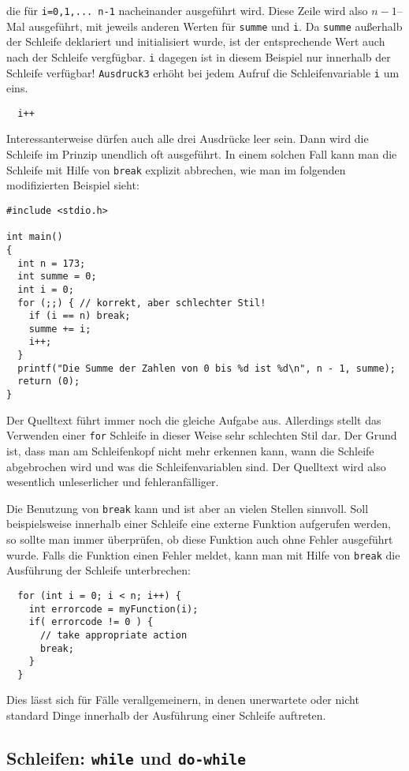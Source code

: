 die für \verb|i=0,1,... n-1| nacheinander ausgeführt wird.
Diese Zeile wird also $n-1$--Mal ausgeführt, mit jeweils anderen Werten für \verb|summe| und \verb|i|.
Da \verb|summe| außerhalb der Schleife deklariert und initialisiert wurde, ist der entsprechende Wert auch nach der Schleife vergfügbar.
\verb|i| dagegen ist in diesem Beispiel nur innerhalb der Schleife verfügbar!
\texttt{Ausdruck3} erhöht bei jedem Aufruf die Schleifenvariable \verb|i| um eins.
\begin{lstlisting}
  i++
\end{lstlisting}
Interessanterweise dürfen auch alle drei Ausdrücke leer sein.
Dann wird die Schleife im Prinzip unendlich oft ausgeführt.
In einem solchen Fall kann man die Schleife mit Hilfe von \verb|break| explizit abbrechen, wie man im folgenden modifizierten Beispiel sieht:
\begin{lstlisting}
#include <stdio.h>

int main()
{
  int n = 173;
  int summe = 0;
  int i = 0;
  for (;;) { // korrekt, aber schlechter Stil!
    if (i == n) break;
    summe += i;
    i++;
  }
  printf("Die Summe der Zahlen von 0 bis %d ist %d\n", n - 1, summe);
  return (0);
}
\end{lstlisting}
Der Quelltext führt immer noch die gleiche Aufgabe aus. 
Allerdings stellt das Verwenden einer \texttt{for} Schleife in dieser Weise sehr schlechten Stil dar.
Der Grund ist, dass man am Schleifenkopf nicht mehr erkennen kann, wann die Schleife abgebrochen wird und was die Schleifenvariablen sind.
Der Quelltext wird also wesentlich unleserlicher und fehleranfälliger.

Die Benutzung von \verb|break| kann und ist aber an vielen Stellen sinnvoll.
Soll beispielsweise innerhalb einer Schleife eine externe Funktion aufgerufen werden, so sollte man immer überprüfen, ob diese Funktion auch ohne Fehler ausgeführt wurde.
Falls die Funktion einen Fehler meldet, kann man mit Hilfe von \verb|break| die Ausführung der Schleife unterbrechen:
\begin{lstlisting}
  for (int i = 0; i < n; i++) {
    int errorcode = myFunction(i);
    if( errorcode != 0 ) {
      // take appropriate action
      break;
    }
  }
\end{lstlisting}
Dies lässt sich für Fälle verallgemeinern, in denen unerwartete oder nicht standard Dinge innerhalb der Ausführung einer Schleife auftreten.

\subsection{Schleifen: \texttt{while} und \texttt{do-while}}

